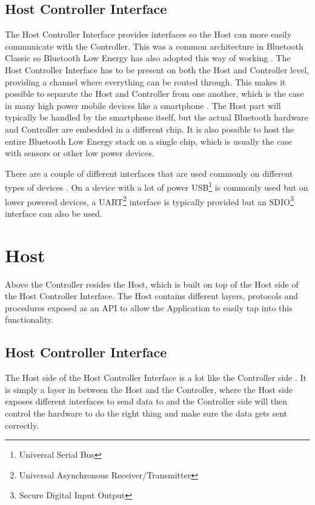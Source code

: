 \documentclass[pdftex,a4paper,12pt,twoside]{report}
\begin{document}
\subsection{Host Controller Interface}
\label{subsec:controllerHCI}
The Host Controller Interface provides interfaces so the Host can more easily communicate with the Controller. This was a common architecture in Bluetooth Classic so Bluetooth Low Energy has also adopted this way of working \citep{heydon2012bluetooth}. The Host Controller Interface has to be present on both the Host and Controller level, providing a channel where everything can be routed through. This makes it possible to separate the Host and Controller from one another, which is the case in many high power mobile devices like a smartphone \citep{Townsend2014}. The Host part will typically be handled by the smartphone itself, but the actual Bluetooth hardware and Controller are embedded in a different chip. It is also possible to host the entire Bluetooth Low Energy stack on a single chip, which is usually the case with sensors or other low power devices.

There are a couple of different interfaces that are used commonly on different types of devices \citep{bluetooth2016training}. On a device with a lot of power  USB\footnote{Universal Serial Bus} is commonly used but on lower powered devices, a UART\footnote{Universal Asynchronous Receiver/Transmitter} interface is typically provided but an SDIO\footnote{Secure Digital Input Output} interface can also be used.

\section{Host}
\label{sec:stackHost}
Above the Controller resides the Host, which is built on top of the Host side of the Host Controller Interface. The Host contains different layers, protocols and procedures exposed as an API to allow the Application to easily tap into this functionality.

\subsection{Host Controller Interface}
\label{subsec:hostHCI}
The Host side of the Host Controller Interface is a lot like the Controller side \citep{heydon2012bluetooth}. It is simply a layer in between the Host and the Controller, where the Host side exposes different interfaces to send data to and the Controller side will then control the hardware to do the right thing and make sure the data gets sent correctly.
\end{document}
